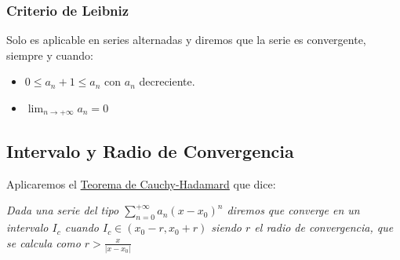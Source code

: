 \subsubsection{Criterio de Leibniz}
\noindent Solo es aplicable en series alternadas y diremos que la serie es convergente, siempre y cuando:
\begin{itemize}
        \item \(0\leq a_n+1 \leq a_n\) con \(a_n\) decreciente.
        \item  \(\lim_{n\rightarrow +\infty} a_n=0\)
\end{itemize}
\subsection{Intervalo y Radio de Convergencia}
\noindent Aplicaremos el \underline{Teorema de Cauchy-Hadamard} que dice: \par \noindent \textit{Dada una serie del tipo \(\sum^{+\infty}_{n=0}a_n(x-x_0)^n\) diremos que converge en un intervalo \(I_c\) cuando \(I_c \in (x_0 - r, x_0 + r)\) siendo \(r\) el radio de convergencia, que se calcula como \(r > \frac{x}{|x- x_0|}\)}